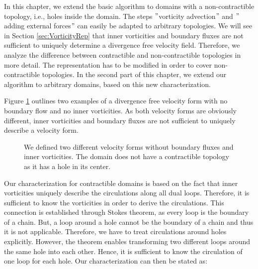 \label{ch:Topology}
In this chapter, we extend the basic algorithm to domains with a non-contractible topology, i.e., holes inside the domain.
The steps $"$vorticity advection$"$ and $"$adding external forces$"$ can easily be adapted to arbitrary topologies.
We will see in Section \ref{sec:VorticityRep} that inner vorticities and boundary fluxes are not
sufficient to uniquely determine a divergence free velocity field.
Therefore, we analyze the difference between contractible and non-contractible topologies in more detail.
The representation has to be modified in order to cover non-contractible topologies.
In the second part of this chapter, we extend our algorithm to arbitrary domains, based on this new characterization.

\label{sec:VorticityRep}

Figure \ref{fig:InfiniteManySolutions} outlines two examples of a divergence free velocity form with no boundary flow and no inner vorticities.
As both velocity forms are obviously different, inner vorticities and boundary fluxes are not sufficient to uniquely describe a velocity form.

\begin{figure}[h!]
\label{fig:InfiniteManySolutions}
	\begin{minipage}[b]{0.5 \linewidth}
		\centering
		\subfigure[A flow of 1]{
			      }
	\end{minipage}
	\begin{minipage}[b]{0.5 \linewidth}
		\centering
		\subfigure[A flow of 2]{
			      }
	\end{minipage}	
\caption[two different velocity forms without boundary fluxes and inner vorticities]
		{We defined two different velocity forms without boundary fluxes and inner vorticities.
			  The domain does not have a contractible topology as it has a hole in its center.}
\end{figure}

Our characterization for contractible domains is based on the fact that inner vorticities uniquely describe the circulations along all dual loops.
Therefore, it is sufficient to know the vorticities in order to derive the circulations.
This connection is established through Stokes theorem, as every loop is the boundary of a chain.
But, a loop around a hole cannot be the boundary of a chain and thus it is not applicable.
Therefore, we have to treat circulations around holes explicitly.
However, the theorem enables transforming two different loops around the same hole into each other.
Hence, it is sufficient to know the circulation of one loop for each hole.
Our characterization can then be stated as:

